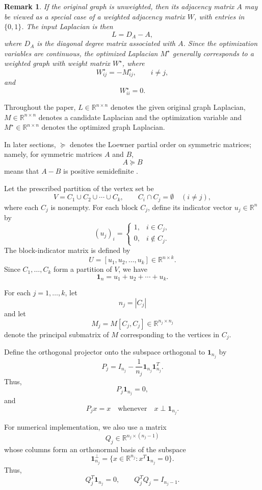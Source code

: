 \documentclass[11pt]{article}
\newtheorem{remark}[theorem]{Remark}
\begin{document}
\begin{remark}
	If the original graph is unweighted, then its adjacency matrix $A$ may be viewed as a special case of a weighted adjacency matrix $W$, with entries in $\{0,1\}$. The input Laplacian is then
	\[
	L=D_A-A,
	\]
	where $D_A$ is the diagonal degree matrix associated with $A$. Since the optimization variables are continuous, the optimized Laplacian $M^\star$ generally corresponds to a weighted graph with weight matrix $W^\star$, where
	\[
	W^\star_{ij}=-M^\star_{ij},\qquad i\ne j,
	\]
	and
	\[
	W^\star_{ii}=0.
	\]
\end{remark}
Throughout the paper, $L\in\mathbb R^{n\times n}$ denotes the given original graph Laplacian, $M\in\mathbb{R}^{n\times n}$ denotes a candidate
Laplacian and the optimization variable  and $M^\star\in\mathbb R^{n\times n}$ denotes the optimized graph Laplacian.

In later sections, $\succeq$ denotes the Loewner partial order on symmetric
matrices; namely, for symmetric matrices $A$ and $B$,
\[
A\succeq B
\]
means that $A-B$ is positive semidefinite
\cite{HornJohnson2013}.

Let the prescribed partition of the vertex set be
\[
V=C_1\cup C_2\cup\cdots\cup C_k,
\qquad
C_i\cap C_j=\emptyset \quad (i\ne j),
\]
where each $C_j$ is nonempty. For each block $C_j$, define its indicator vector $u_j\in\mathbb R^n$ by
\[
(u_j)_i=
\begin{cases}
	1, & i\in C_j,\\
	0, & i\notin C_j.
\end{cases}
\]
The block-indicator matrix is defined by
\[
U=[u_1,u_2,\ldots,u_k]\in\mathbb R^{n\times k}.
\]
Since $C_1,\ldots,C_k$ form a partition of $V$, we have
\[
\mathbf 1_n=u_1+u_2+\cdots+u_k.
\]

For each $j=1,\ldots,k$, let
\[
n_j=|C_j|
\]
and let
\[
M_j=M[C_j,C_j]\in\mathbb R^{n_j\times n_j}
\]
denote the principal submatrix of $M$ corresponding to the vertices in $C_j$.

Define the orthogonal projector onto the subspace orthogonal to $\mathbf 1_{n_j}$ by
\[
P_j
=
I_{n_j}
-
\frac{1}{n_j}\mathbf 1_{n_j}\mathbf 1_{n_j}^T.
\]
Thus,
\[
P_j\mathbf 1_{n_j}=0,
\]
and
\[
P_jx=x
\quad\text{whenever}\quad
x\perp \mathbf 1_{n_j}.
\]

For numerical implementation, we also use a matrix
\[
Q_j\in\mathbb R^{n_j\times(n_j-1)}
\]
whose columns form an orthonormal basis of the subspace
\[
\mathbf 1_{n_j}^{\perp}
=
\{x\in\mathbb R^{n_j}:x^T\mathbf 1_{n_j}=0\}.
\]
Thus,
\[
Q_j^T\mathbf 1_{n_j}=0,
\qquad
Q_j^TQ_j=I_{n_j-1}.
\]
\end{document}

